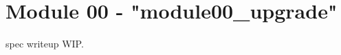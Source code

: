 \newpage
\section{Module 00 - {\ttfamily "module00\_upgrade"}}
\label{sec:module00_predicate}

spec writeup WIP.





